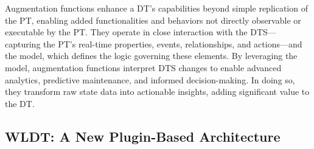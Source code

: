 Augmentation functions enhance a DT’s capabilities beyond simple replication of the PT, enabling added functionalities and behaviors not directly observable or executable by the PT. They operate in close interaction with the DTS—capturing the PT’s real-time properties, events, relationships, and actions—and the model, which defines the logic governing these elements. By leveraging the model, augmentation functions interpret DTS changes to enable advanced analytics, predictive maintenance, and informed decision-making. In doing so, they transform raw state data into actionable insights, adding significant value to the DT.





\subsection{WLDT: A New Plugin-Based Architecture} 
\label{sec:wldt-architecture}


